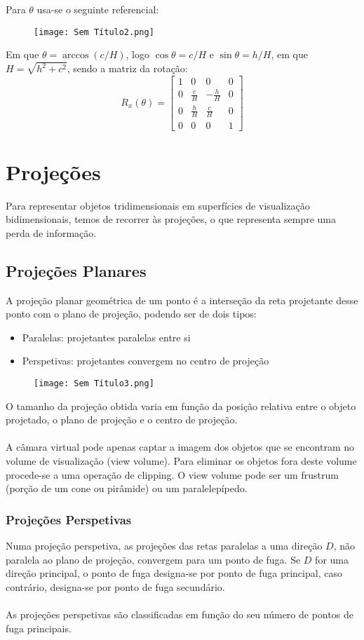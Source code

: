 \documentclass[10pt,a4paper]{report}
\begin{document}
Para $\theta$ usa-se o seguinte referencial:
\begin{figure}[H]
\centering
\texttt{[image: Sem Título2.png]}
\end{figure}
Em que $\theta = \arccos(c/H)$, logo $\cos \theta = c/H$ e $\sin \theta = h/H$, em que $H = \sqrt{h^2+c^2}$, sendo a matriz da rotação:
$$
R_x(\theta) = \begin{bmatrix}
1 & 0 & 0 & 0\\
0 & \frac{c}{H} & -\frac{h}{H} & 0\\
0 & \frac{h}{H} & \frac{c}{H} & 0\\
0 & 0 & 0 & 1
\end{bmatrix}
$$

\chapter{Projeções}
Para representar objetos tridimensionais em superfícies de visualização bidimensionais, temos de recorrer às projeções, o que representa sempre uma perda de informação.
\section{Projeções Planares}
A projeção planar geométrica de um ponto é a interseção da reta projetante desse ponto com o plano de projeção, podendo ser de dois tipos:
\begin{itemize}
\item Paralelas: projetantes paralelas entre si
\item Perspetivas: projetantes convergem no centro de projeção
\end{itemize}
\begin{figure}[H]
\centering
\texttt{[image: Sem Título3.png]}
\end{figure}
O tamanho da projeção obtida varia em função da posição relativa entre o objeto projetado, o plano de projeção e o centro de projeção.\\
\\
A câmara virtual pode apenas captar a imagem dos objetos que se encontram no volume de visualização (view volume). Para eliminar os objetos fora deste volume procede-se a uma operação de clipping. O view volume pode ser um frustrum (porção de um cone ou pirâmide) ou um paralelepípedo.
\subsection{Projeções Perspetivas}
Numa projeção perspetiva, as projeções das retas paralelas a uma direção $D$, não paralela ao plano de projeção, convergem para um ponto de fuga. Se $D$ for uma direção principal, o ponto de fuga designa-se por ponto de fuga principal, caso contrário, designa-se por ponto de fuga secundário.\\
\\
As projeções perspetivas são classificadas em função do seu número de pontos de fuga principais.
\end{document}

